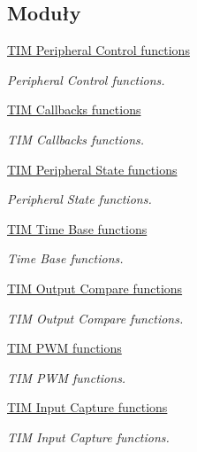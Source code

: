\subsection*{Moduły}
\begin{DoxyCompactItemize}
\item 
\hyperlink{group___t_i_m___exported___functions___group8}{T\+I\+M Peripheral Control functions}
\begin{DoxyCompactList}\small\item\em Peripheral Control functions. \end{DoxyCompactList}\item 
\hyperlink{group___t_i_m___exported___functions___group9}{T\+I\+M Callbacks functions}
\begin{DoxyCompactList}\small\item\em T\+IM Callbacks functions. \end{DoxyCompactList}\item 
\hyperlink{group___t_i_m___exported___functions___group10}{T\+I\+M Peripheral State functions}
\begin{DoxyCompactList}\small\item\em Peripheral State functions. \end{DoxyCompactList}\item 
\hyperlink{group___t_i_m___exported___functions___group1}{T\+I\+M Time Base functions}
\begin{DoxyCompactList}\small\item\em Time Base functions. \end{DoxyCompactList}\item 
\hyperlink{group___t_i_m___exported___functions___group2}{T\+I\+M Output Compare functions}
\begin{DoxyCompactList}\small\item\em T\+IM Output Compare functions. \end{DoxyCompactList}\item 
\hyperlink{group___t_i_m___exported___functions___group3}{T\+I\+M P\+W\+M functions}
\begin{DoxyCompactList}\small\item\em T\+IM P\+WM functions. \end{DoxyCompactList}\item 
\hyperlink{group___t_i_m___exported___functions___group4}{T\+I\+M Input Capture functions}
\begin{DoxyCompactList}\small\item\em T\+IM Input Capture functions. \end{DoxyCompactList}\item 

\end{DoxyCompactItemize}
